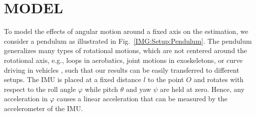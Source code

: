 \section{MODEL}\label{sec:Model}
To model the effects of angular motion around a fixed axis on the estimation, we consider a pendulum as illustrated in Fig.~\ref{IMG:Setup:Pendulum}.
The pendulum generalizes many types of rotational motions, which are not centered around the rotational axis, e.g., loops in aerobatics, joint motions in exoskeletons, or curve driving in vehicles \cite{Nazarahari2021, Gajamohan2012}, such that our results can be easily transferred to different setups.
The \ac{IMU} is placed at a fixed distance $l$ to the point $O$ and rotates with respect to the roll angle $\varphi$ while pitch $\theta$ and yaw $\psi$ are held at zero.
Hence, any acceleration in $\varphi$ causes a linear acceleration that can be measured by the accelerometer of the \ac{IMU}.

